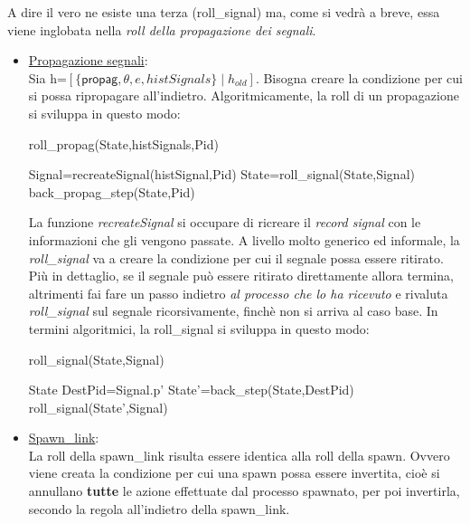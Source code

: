 \documentclass[Contributo.tex]{subfiles}
\begin{document}
	A dire il vero ne esiste una terza (roll\_signal) ma, come si vedrà a breve, essa viene inglobata nella \textit{roll della propagazione dei segnali}.
	\begin{itemize}
		\item \underline{Propagazione segnali}:\\
		Sia h=$\displaystyle [\{\mathsf{propag},\theta,e,histSignals\} \mid h_{old}]$.
		Bisogna creare la condizione per cui si possa ripropagare all'indietro.
		Algoritmicamente, la roll di un propagazione si sviluppa in questo modo:\\
		\begin{algorithm}[H]
		\caption{roll\_propag(State,histSignals,Pid)}
		\begin{algorithmic}
			\STATE Signal=recreateSignal(histSignal,Pid)
			\STATE State=roll\_signal(State,Signal)
		\ENDFOR
		\RETURN back\_propag\_step(State,Pid)
		\end{algorithmic}
		\end{algorithm}
		La funzione \textit{recreateSignal} si occupare di ricreare il \textit{record signal} con le informazioni che gli vengono passate. 
		A livello molto generico ed informale, la \textit{roll\_signal} va a creare la condizione per cui il segnale possa essere ritirato.
		Più in dettaglio, se il segnale può essere ritirato direttamente allora termina, altrimenti fai fare un passo indietro \textit{al processo che lo ha ricevuto} e rivaluta \textit{roll\_signal} sul segnale ricorsivamente, finchè non si arriva al caso base.
		In termini algoritmici, la roll\_signal si sviluppa in questo modo:\\
		\begin{algorithm}[H]
		\caption{roll\_signal(State,Signal)}
		\begin{algorithmic}
		\IF {Signal $\in$ $\Psi$} 
			\RETURN State
		\ELSE
			\STATE DestPid=Signal.p'
			\STATE State'=back\_step(State,DestPid)
			\RETURN roll\_signal(State',Signal)
		\ENDIF
		\end{algorithmic}
		\end{algorithm}
		\item \underline{Spawn\_link}:\\
			La roll della spawn\_link risulta essere identica alla roll della spawn.
			Ovvero viene creata la condizione per cui una spawn possa essere invertita, cioè si annullano \textbf{tutte} le azione effettuate dal processo spawnato, per poi invertirla,
			secondo la regola all'indietro della spawn\_link.
	\end{itemize}
\end{document}
